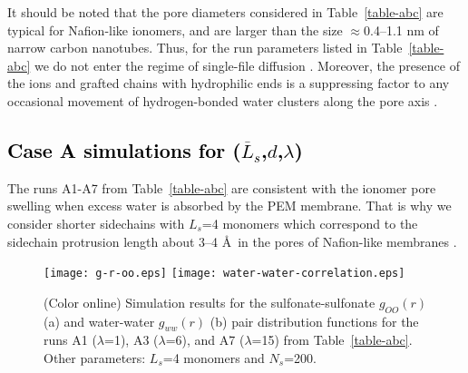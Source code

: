 \documentclass[3p,english,preprint]{elsarticle}
\newcommand{\mod}[1]{\textcolor{black}{#1}}
\newcommand{\mage}[1]{\textcolor{black}{#1}}
\begin{document}
It should be noted that the pore diameters considered in 
Table~\ref{table-abc}  
are typical for Nafion-like ionomers, and are   
larger than the size $\approx$0.4--1.1 nm of narrow carbon nanotubes.  
Thus, for the run parameters listed in Table~\ref{table-abc}
  we do not enter the regime of single-file diffusion 
\cite{mukherjee-2010, striolo-2007,striolo-2006}. 
Moreover,  the presence of the ions and grafted chains with hydrophilic ends 
 is a suppressing factor to any occasional movement 
of hydrogen-bonded water clusters along the pore axis 
\cite{joseph-aluru-2008,dellago-hummer-2003}. 
























{\mod{ 
\subsection{Case A simulations for  ($\overline L_s$,$d$,$\lambda$)}
}}


The runs A1-A7 from Table~\ref{table-abc} are consistent with the ionomer pore swelling 
when excess  water is absorbed by the PEM membrane. That is why we consider shorter
sidechains with $L_s$=4 monomers which correspond to the sidechain protrusion length about 3--4 \AA \, in 
the pores of  Nafion-like membranes 
\cite{paddison-2003-review}.

\begin{figure}  [!ht]
\begin{center}
\texttt{[image: g-r-oo.eps]} 
\texttt{[image: water-water-correlation.eps]}
\end{center}
\vspace{-0.5cm}
\caption{(Color online)  Simulation results 
for the sulfonate-sulfonate $g_{OO}(r)$ (a) and water-water $g_{ww}(r)$ (b) 
 pair distribution functions  for the runs 
A1 ($\lambda$=1), A3 ($\lambda$=6), and A7 ($\lambda$=15) from 
 Table~\ref{table-abc}.
Other parameters: $L_s$=4 monomers and $N_s$=200. 
\label{fig-4-new}}
\end{figure}
\end{document}
